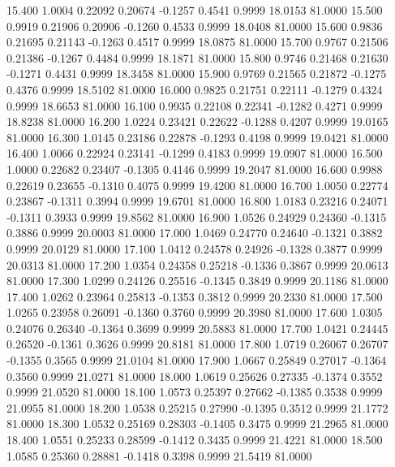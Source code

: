   15.400   1.0004   0.22092   0.20674  -0.1257   0.4541   0.9999  18.0153  81.0000
  15.500   0.9919   0.21906   0.20906  -0.1260   0.4533   0.9999  18.0408  81.0000
  15.600   0.9836   0.21695   0.21143  -0.1263   0.4517   0.9999  18.0875  81.0000
  15.700   0.9767   0.21506   0.21386  -0.1267   0.4484   0.9999  18.1871  81.0000
  15.800   0.9746   0.21468   0.21630  -0.1271   0.4431   0.9999  18.3458  81.0000
  15.900   0.9769   0.21565   0.21872  -0.1275   0.4376   0.9999  18.5102  81.0000
  16.000   0.9825   0.21751   0.22111  -0.1279   0.4324   0.9999  18.6653  81.0000
  16.100   0.9935   0.22108   0.22341  -0.1282   0.4271   0.9999  18.8238  81.0000
  16.200   1.0224   0.23421   0.22622  -0.1288   0.4207   0.9999  19.0165  81.0000
  16.300   1.0145   0.23186   0.22878  -0.1293   0.4198   0.9999  19.0421  81.0000
  16.400   1.0066   0.22924   0.23141  -0.1299   0.4183   0.9999  19.0907  81.0000
  16.500   1.0000   0.22682   0.23407  -0.1305   0.4146   0.9999  19.2047  81.0000
  16.600   0.9988   0.22619   0.23655  -0.1310   0.4075   0.9999  19.4200  81.0000
  16.700   1.0050   0.22774   0.23867  -0.1311   0.3994   0.9999  19.6701  81.0000
  16.800   1.0183   0.23216   0.24071  -0.1311   0.3933   0.9999  19.8562  81.0000
  16.900   1.0526   0.24929   0.24360  -0.1315   0.3886   0.9999  20.0003  81.0000
  17.000   1.0469   0.24770   0.24640  -0.1321   0.3882   0.9999  20.0129  81.0000
  17.100   1.0412   0.24578   0.24926  -0.1328   0.3877   0.9999  20.0313  81.0000
  17.200   1.0354   0.24358   0.25218  -0.1336   0.3867   0.9999  20.0613  81.0000
  17.300   1.0299   0.24126   0.25516  -0.1345   0.3849   0.9999  20.1186  81.0000
  17.400   1.0262   0.23964   0.25813  -0.1353   0.3812   0.9999  20.2330  81.0000
  17.500   1.0265   0.23958   0.26091  -0.1360   0.3760   0.9999  20.3980  81.0000
  17.600   1.0305   0.24076   0.26340  -0.1364   0.3699   0.9999  20.5883  81.0000
  17.700   1.0421   0.24445   0.26520  -0.1361   0.3626   0.9999  20.8181  81.0000
  17.800   1.0719   0.26067   0.26707  -0.1355   0.3565   0.9999  21.0104  81.0000
  17.900   1.0667   0.25849   0.27017  -0.1364   0.3560   0.9999  21.0271  81.0000
  18.000   1.0619   0.25626   0.27335  -0.1374   0.3552   0.9999  21.0520  81.0000
  18.100   1.0573   0.25397   0.27662  -0.1385   0.3538   0.9999  21.0955  81.0000
  18.200   1.0538   0.25215   0.27990  -0.1395   0.3512   0.9999  21.1772  81.0000
  18.300   1.0532   0.25169   0.28303  -0.1405   0.3475   0.9999  21.2965  81.0000
  18.400   1.0551   0.25233   0.28599  -0.1412   0.3435   0.9999  21.4221  81.0000
  18.500   1.0585   0.25360   0.28881  -0.1418   0.3398   0.9999  21.5419  81.0000

